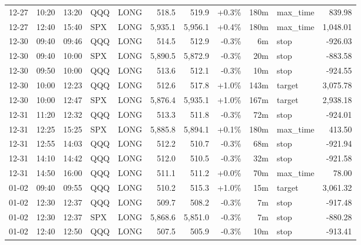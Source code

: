 \documentclass[11pt,a4paper,twoside]{article}
\begin{document}
\begin{center}
\begin{longtable}{>{\color{txtmain}}l l l l l r r r r >{\color{txtmain}}l r}
12-27 & 10:20 & 13:20 & QQQ & LONG & 518.5 & 519.9 & \textcolor{wingreen}{+0.3\%} & 180m & max\_time & \textcolor{wingreen}{839.98} \\
12-27 & 12:40 & 15:40 & SPX & LONG & 5,935.1 & 5,956.1 & \textcolor{wingreen}{+0.4\%} & 180m & max\_time & \textcolor{wingreen}{1,048.01} \\
12-30 & 09:40 & 09:46 & QQQ & LONG & 514.5 & 512.9 & \textcolor{lossred}{-0.3\%} & 6m & stop & \textcolor{lossred}{-926.03} \\
12-30 & 09:40 & 10:00 & SPX & LONG & 5,890.5 & 5,872.9 & \textcolor{lossred}{-0.3\%} & 20m & stop & \textcolor{lossred}{-883.58} \\
12-30 & 09:50 & 10:00 & QQQ & LONG & 513.6 & 512.1 & \textcolor{lossred}{-0.3\%} & 10m & stop & \textcolor{lossred}{-924.55} \\
12-30 & 10:00 & 12:23 & QQQ & LONG & 512.6 & 517.8 & \textcolor{wingreen}{+1.0\%} & 143m & target & \textcolor{wingreen}{3,075.78} \\
12-30 & 10:00 & 12:47 & SPX & LONG & 5,876.4 & 5,935.1 & \textcolor{wingreen}{+1.0\%} & 167m & target & \textcolor{wingreen}{2,938.18} \\
12-31 & 11:20 & 12:32 & QQQ & LONG & 513.3 & 511.8 & \textcolor{lossred}{-0.3\%} & 72m & stop & \textcolor{lossred}{-924.01} \\
12-31 & 12:25 & 15:25 & SPX & LONG & 5,885.8 & 5,894.1 & \textcolor{wingreen}{+0.1\%} & 180m & max\_time & \textcolor{wingreen}{413.50} \\
12-31 & 12:55 & 14:03 & QQQ & LONG & 512.2 & 510.7 & \textcolor{lossred}{-0.3\%} & 68m & stop & \textcolor{lossred}{-921.94} \\
12-31 & 14:10 & 14:42 & QQQ & LONG & 512.0 & 510.5 & \textcolor{lossred}{-0.3\%} & 32m & stop & \textcolor{lossred}{-921.58} \\
12-31 & 14:50 & 16:00 & QQQ & LONG & 511.1 & 511.2 & \textcolor{wingreen}{+0.0\%} & 70m & max\_time & \textcolor{wingreen}{78.00} \\
01-02 & 09:40 & 09:55 & QQQ & LONG & 510.2 & 515.3 & \textcolor{wingreen}{+1.0\%} & 15m & target & \textcolor{wingreen}{3,061.32} \\
01-02 & 12:30 & 12:37 & QQQ & LONG & 509.7 & 508.2 & \textcolor{lossred}{-0.3\%} & 7m & stop & \textcolor{lossred}{-917.48} \\
01-02 & 12:30 & 12:37 & SPX & LONG & 5,868.6 & 5,851.0 & \textcolor{lossred}{-0.3\%} & 7m & stop & \textcolor{lossred}{-880.28} \\
01-02 & 12:40 & 12:50 & QQQ & LONG & 507.5 & 505.9 & \textcolor{lossred}{-0.3\%} & 10m & stop & \textcolor{lossred}{-913.41} \\

\end{longtable}
\end{center}
\end{document}
